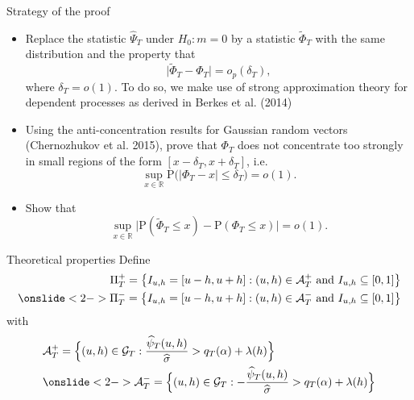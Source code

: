 \documentclass[10pt]{beamer}
\newcommand{\Prob}{\mathrm{P}}
\begin{document}
\begin{frame}{Strategy of the proof}
\begin{itemize}
\item Replace the statistic $\widehat{\Psi}_T$ under $H_0: m = 0$ by a statistic $\widetilde{\Phi}_T$ with the same distribution and the property that 
\begin{equation*}\label{eq-theo-stat-strategy-step1}
\big| \widetilde{\Phi}_T - \Phi_T \big| = o_p(\delta_T),
\end{equation*}
where $\delta_T = o(1)$. To do so, we make use of strong approximation theory for dependent processes as derived in Berkes et al. (2014)\pause
\vspace{2mm}
\item Using the anti-concentration results for Gaussian random vectors (Chernozhukov et al. 2015), prove that $\Phi_T$ does not concentrate too strongly in small regions of the form $[x-\delta_T,x+\delta_T]$, i.e.
\begin{equation*}\label{eq-theo-stat-strategy-step2}
\sup_{x \in \mathbb{R}} \Prob \big( |\Phi_T - x| \le \delta_T \big) = o(1).
\end{equation*}\pause
\vspace{-2mm}
\item Show that 
\begin{equation*}\label{eq-theo-stat-strategy-claim}
\sup_{x \in \mathbb{R}} \big| \Prob(\widetilde{\Phi}_T \le x) - \Prob(\Phi_T \le x) \big| = o(1). 
\end{equation*}
\end{itemize}
\end{frame}


\begin{frame}{Theoretical properties}
Define
\begin{align*}
\Pi_T^+ = \big\{ I_{u,h} = [u-h,u+h]: (u,h) \in \mathcal{A}_T^+ \text{ and } I_{u, h} \subseteq [0,1] \big\}\\
\onslide<2->{\Pi_T^- = \big\{ I_{u,h} = [u-h,u+h]: (u,h) \in \mathcal{A}_T^- \text{ and } I_{u, h} \subseteq [0,1] \big\}}
\end{align*}
\vspace{-5mm}
with
\begin{align*} 
&\mathcal{A}_T^+ = \Big\{ (u,h) \in \mathcal{G}_T: \frac{\widehat{\psi}_T(u,h)}{\widehat{\sigma}} > q_T(\alpha)  + \lambda(h)  \Big\}\\
&\onslide<2->{\mathcal{A}_T^- = \Big\{ (u,h) \in \mathcal{G}_T: -\frac{\widehat{\psi}_T(u,h)}{\widehat{\sigma}} > q_T(\alpha)  + \lambda(h)  \Big\}}
\end{align*}
\end{frame}
\end{document}
